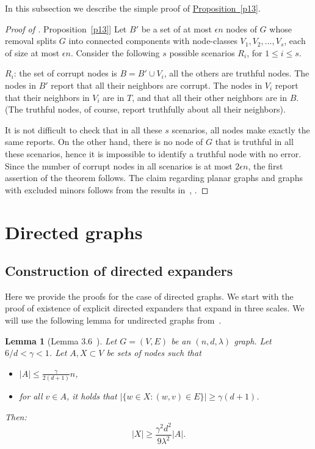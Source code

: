 \documentclass[11pt]{article}
\numberwithin{equation}{section}
\newtheorem{lemma}[theorem]{Lemma}
\theoremstyle{definition}
\theoremstyle{plain}
\newcommand{\expref}[2]{\hyperref[#2]{#1~\ref{#2}}}
\begin{document}
In this subsection we describe the simple proof of \expref{Proposition}{p13}. 
\vspace{0.3cm}

\begin{proof}[Proof of \expref{Proposition}{p13}]
Let $B'$ be a set of at most $\epsilon n$ nodes of $G$ whose
removal splits $G$ into connected components with node-classes
$V_1,V_2, \ldots ,V_s$, each of size at most $\epsilon n$. Consider
the following $s$ possible scenarios $R_i$, for $1 \leq i \leq s$.

\smallskip
\noindent
$R_i$:  the set of corrupt nodes is $B=B' \cup V_i$, all the others
are 
%
truthful   %
nodes. The nodes in $B'$ report that all their
neighbors are corrupt. The nodes in $V_i$ report that their
neighbors in $V_i$ are in $T$, and that all their other neighbors 
are in $B$. (The truthful nodes, of course, report truthfully
about all their neighbors).

\smallskip
\noindent
It is not difficult to check that in all these $s$ scenarios, all
nodes make exactly the same reports. On the other hand, there is
no node of $G$ that is truthful in all these scenarios, hence 
it is impossible to identify a truthful node with no
error. Since the number of corrupt nodes in all scenarios is at most
$2 \epsilon n$, the first assertion of the theorem follows. The
claim regarding planar graphs and graphs with excluded minors
follows from the results in~\cite{LT}, \cite{AST}.
\end{proof}

\section{Directed graphs} \label{sec:directed}

\subsection{Construction of directed expanders}


Here we provide the proofs for the case of directed graphs. We start with
the proof of existence of explicit directed expanders that expand 
in three scales. 
We will use the following lemma for undirected graphs from~\cite{AKRS}. 
\begin{lemma}[Lemma 3.6~\cite{AKRS}]  \label{lem:frac_expand}
Let $G=(V,E)$ be an $(n,d,\lambda)$ graph. Let $6/d < \gamma < 1$. Let $A,X \subset V$ be sets of nodes such that 
\begin{itemize}
\item $|A| \leq \frac{\gamma}{2(d+1)} n$,
\item for all $v \in A$, it holds that $|\{ w \in X : (w,v) \in E\}| \geq \gamma(d+1)$.
\end{itemize}
Then: 
\[
|X| \geq \frac{\gamma^2 d^2}{9 \lambda^2} |A|.
\]
\end{lemma} 
\end{document}
